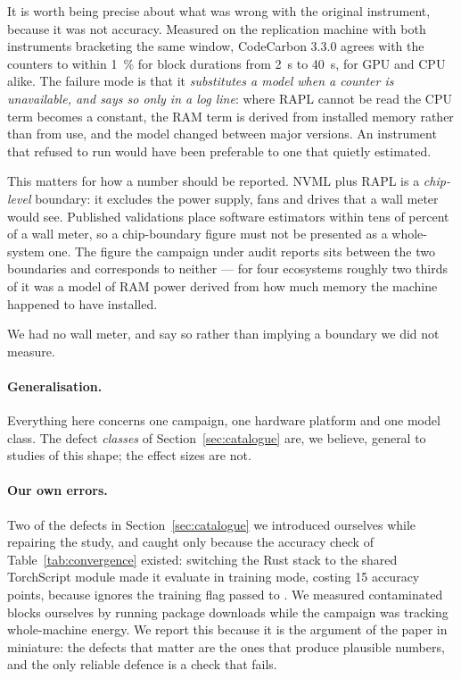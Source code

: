 It is worth being precise about what was wrong with the original instrument,
because it was not accuracy. Measured on the replication machine with both
instruments bracketing the same window, CodeCarbon 3.3.0 agrees with the counters
to within \SI{1}{\percent} for block durations from \SI{2}{\second} to
\SI{40}{\second}, for GPU and CPU alike. The failure mode is that it
\emph{substitutes a model when a counter is unavailable, and says so only in a
log line}: where RAPL cannot be read the CPU term becomes a constant, the RAM term
is derived from installed memory rather than from use, and the model changed
between major versions. An instrument that refused to run would have been
preferable to one that quietly estimated.

This matters for how a number should be reported. NVML plus RAPL is a
\emph{chip-level} boundary: it excludes the power supply, fans and drives that a
wall meter would see. Published validations place software estimators within tens
of percent of a wall meter, so a chip-boundary figure must not be presented as a
whole-system one. The figure the campaign under audit reports sits between the two
boundaries and corresponds to neither --- for four ecosystems roughly two thirds
of it was a model of RAM power derived from how much memory the machine happened
to have installed.

We had no wall meter, and say so rather than implying a boundary we did not
measure.

\paragraph{Generalisation.}
Everything here concerns one campaign, one hardware platform and one model class.
The defect \emph{classes} of Section~\ref{sec:catalogue} are, we believe, general
to studies of this shape; the effect sizes are not.

\paragraph{Our own errors.}
Two of the defects in Section~\ref{sec:catalogue} we introduced ourselves while
repairing the study, and caught only because the accuracy check of
Table~\ref{tab:convergence} existed: switching the Rust stack to the shared
TorchScript module made it evaluate in training mode, costing 15 accuracy points,
because  ignores the training flag passed to
. We measured contaminated blocks ourselves by running package
downloads while the campaign was tracking whole-machine energy. We report this
because it is the argument of the paper in miniature: the defects that matter are
the ones that produce plausible numbers, and the only reliable defence is a check
that fails.
